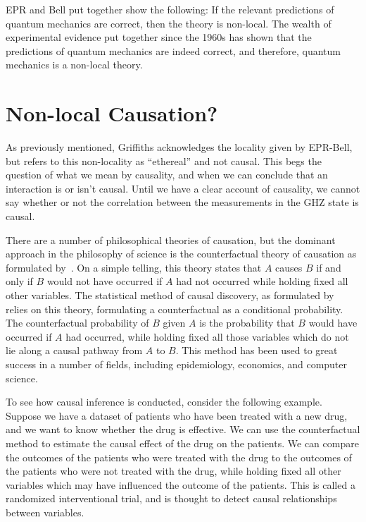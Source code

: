 \documentclass[11pt, a4paper]{article}
\begin{document}
EPR and Bell put together show the following: If the relevant predictions of 
quantum mechanics are correct, then the theory is non-local. The wealth of 
experimental evidence put together since the 1960s has shown that the
predictions of quantum mechanics are indeed correct, and therefore, quantum
mechanics is a non-local theory.

\section{Non-local Causation?}

As previously mentioned, Griffiths acknowledges the locality given by EPR-Bell, 
but refers to this non-locality as ``ethereal'' and not causal. This begs the
question of what we mean by causality, and when we can conclude that an
interaction is or isn't causal. Until we have a clear account of causality, we 
cannot say whether or not the correlation between the measurements in the GHZ
state is causal.

There are a number of philosophical theories of causation, but the dominant
approach in the philosophy of science is the counterfactual theory of causation
as formulated by~\cite{Lewis_1973}. On a simple telling, this theory states that
$A$ causes $B$ if and only if $B$ would not have occurred if $A$ had not
occurred while holding fixed all other variables. The statistical method of
causal discovery, as formulated by~\cite{Pearl_1995} relies on this theory, 
formulating a counterfactual as a conditional probability. The counterfactual
probability of $B$ given $A$ is the probability that $B$ would have occurred if
$A$ had occurred, while holding fixed all those variables which do not lie along
a causal pathway from $A$ to $B$. This method has been used to great success in
a number of fields, including epidemiology, economics, and computer science.

To see how causal inference is conducted, consider the following example.
Suppose we have a dataset of patients who have been treated with a new drug, and
we want to know whether the drug is effective. We can use the counterfactual
method to estimate the causal effect of the drug on the patients. We can compare
the outcomes of the patients who were treated with the drug to the outcomes of
the patients who were not treated with the drug, while holding fixed all other
variables which may have influenced the outcome of the patients. This is called
a randomized interventional trial, and is thought to detect causal relationships
between variables.
\end{document}
